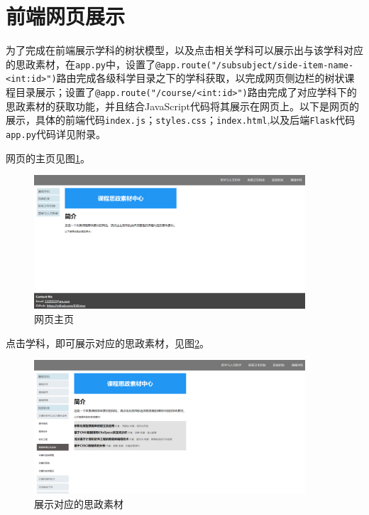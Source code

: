 \documentclass[11pt]{article}
\begin{document}
  
  \section{前端网页展示}
  为了完成在前端展示学科的树状模型，以及点击相关学科可以展示出与该学科对应的思政素材，在\verb|app.py|中，设置了\lstinline{@app.route("/subsubject/side-item-name-<int:id>")}路由完成各级科学目录之下的学科获取，以完成网页侧边栏的树状课程目录展示；设置了\verb|@app.route("/course/<int:id>")|路由完成了对应学科下的思政素材的获取功能，并且结合JavaScript代码将其展示在网页上。以下是网页的展示，具体的前端代码\verb|index.js|；\verb|styles.css|；\verb|index.html|,以及后端\verb|Flask|代码\verb|app.py|代码详见附录。

  网页的主页见图\ref{fig:home}。
  \begin{figure}[h]
    \centering
    \includegraphics[width=0.9\textwidth]{home.png}
    \caption{网页主页}
    \label{fig:home}
  \end{figure}

  点击学科，即可展示对应的思政素材，见图\ref{fig:onclick}。
  \begin{figure}[h]
    \centering
    \includegraphics[width=0.9\textwidth]{onclick.png}
    \caption{展示对应的思政素材}
    \label{fig:onclick}
  \end{figure}
\end{document}
